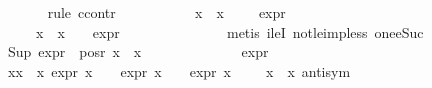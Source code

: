 \begin{isabellebody}
\ \ \ \ \ \ \isamarkupfalse%
{\isacharparenleft}{\kern0pt}rule\ ccontr{\isacharparenright}{\kern0pt}\isanewline
\ \ \ \ \ \ \ \ \isamarkupfalse%
\ {\isachardoublequoteopen}{\isasymnot}\ {\isacharparenleft}{\kern0pt}{\isasymforall}{\isasympsi}{\isasymin}x{}{}\ {\isacharbackquote}{\kern0pt}\ x{}{}{\isachardot}{\kern0pt}\ {\isasympsi}\ {\isasymnoteq}\ {\isasymphi}\ {\isasymlongrightarrow}\ expr{\isacharunderscore}{\kern0pt}{}\ {\isasympsi}\ {\isasymle}\ {}{\isacharparenright}{\kern0pt}{\isachardoublequoteclose}\isanewline
\ \ \ \ \ \ \ \ \isamarkupfalse%
\ \isamarkupfalse%
\ {\isasympsi}\ \ {\isachardoublequoteopen}{\isasympsi}\ {\isasymin}\ x{}{}\ {\isacharbackquote}{\kern0pt}\ x{}{}{\isachardoublequoteclose}\ {\isachardoublequoteopen}{\isasympsi}\ {\isasymnoteq}\ {\isasymphi}{\isachardoublequoteclose}\ {\isachardoublequoteopen}expr{\isacharunderscore}{\kern0pt}{}\ {\isasympsi}\ {\isasymge}\ {}{\isachardoublequoteclose}\isanewline
\ \ \ \ \ \ \ \ \ \ \isamarkupfalse%
\ {\isacharparenleft}{\kern0pt}metis\ ileI{}\ not{\isacharunderscore}{\kern0pt}le{\isacharunderscore}{\kern0pt}imp{\isacharunderscore}{\kern0pt}less\ one{\isacharunderscore}{\kern0pt}eSuc{\isacharparenright}{\kern0pt}\isanewline
\ \ \ \ \ \ \ \ \isamarkupfalse%
\ {\isachardoublequoteopen}Sup\ {\isacharparenleft}{\kern0pt}expr{\isacharunderscore}{\kern0pt}{}\ {\isacharbackquote}{\kern0pt}\ {\isacharparenleft}{\kern0pt}pos{\isacharunderscore}{\kern0pt}r\ {\isacharparenleft}{\kern0pt}x{}{}\ {\isacharbackquote}{\kern0pt}\ x{}{}{\isacharparenright}{\kern0pt}{\isacharparenright}{\kern0pt}{\isacharparenright}{\kern0pt}\ {\isachargreater}{\kern0pt}{\isacharequal}{\kern0pt}\ {}{\isachardoublequoteclose}\isanewline
\ \ \ \ \ \ \ \ \ \ \isamarkupfalse%
\ {\isacartoucheopen}expr{\isacharunderscore}{\kern0pt}{}\ {\isasymphi}\ {\isacharequal}{\kern0pt}\ {}{\isacartoucheclose}\isanewline
\ \ \ \ \ \ \ \ \ \ \isamarkupfalse%
\ {\isacartoucheopen}{\isasymforall}x{\isasymin}x{}{}\ {\isacharbackquote}{\kern0pt}\ x{}{}{\isachardot}{\kern0pt}\ expr{\isacharunderscore}{\kern0pt}{}\ x\ {\isasymle}\ {}\ {\isasymand}\ expr{\isacharunderscore}{\kern0pt}{}\ x\ {\isasymle}\ {}\ {\isasymand}\ expr{\isacharunderscore}{\kern0pt}{}\ x\ {\isasymle}\ {}{\isacartoucheclose}\ {\isacartoucheopen}{\isasymphi}\ {\isasymin}\ x{}{}\ {\isacharbackquote}{\kern0pt}\ x{}{}{\isacartoucheclose}\ antisym\isanewline

\end{isabellebody}
